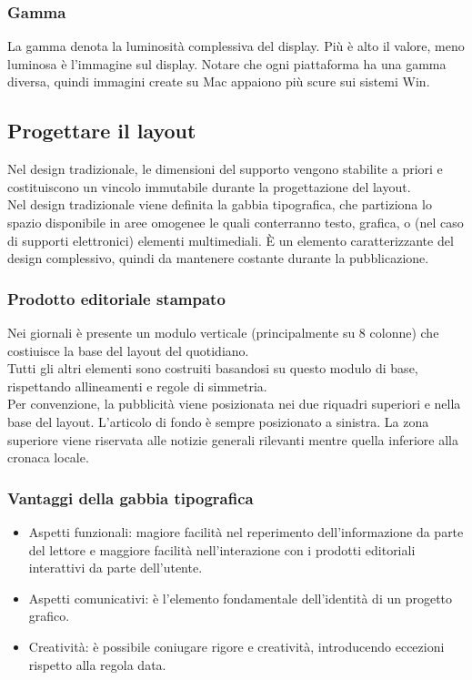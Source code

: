 \documentclass{article}
\begin{document}
\subsubsection{Gamma}
La gamma denota la luminosità complessiva del display. Più è alto il valore, meno luminosa è l'immagine sul display. Notare che ogni piattaforma ha una gamma diversa, quindi immagini create su Mac appaiono più scure sui sistemi Win.
\subsection{Progettare il layout}
Nel design tradizionale, le dimensioni del supporto vengono stabilite a priori e costituiscono un vincolo immutabile durante la progettazione del layout.\\
Nel design tradizionale viene definita la gabbia tipografica, che partiziona lo spazio disponibile in aree omogenee le quali conterranno testo, grafica, o (nel caso di supporti elettronici) elementi multimediali. È un elemento caratterizzante del design complessivo, quindi da mantenere costante durante la pubblicazione.
\subsubsection{Prodotto editoriale stampato}
Nei giornali è presente un modulo verticale (principalmente su 8 colonne) che costiuisce la base del layout del quotidiano.\\
Tutti gli altri elementi sono costruiti basandosi su questo modulo di base, rispettando allineamenti e regole di simmetria.\\
Per convenzione, la pubblicità viene posizionata nei due riquadri superiori e nella base del layout. L'articolo di fondo è sempre posizionato a sinistra. La zona superiore viene riservata alle notizie generali rilevanti mentre quella inferiore alla cronaca locale.
\subsubsection{Vantaggi della gabbia tipografica}
\begin{itemize}
\item Aspetti funzionali: magiore facilità nel reperimento dell'informazione da parte del lettore e maggiore facilità nell'interazione con i prodotti editoriali interattivi da parte dell'utente.
\item Aspetti comunicativi: è l'elemento fondamentale dell'identità di un progetto grafico.
\item Creatività: è possibile coniugare rigore e creatività, introducendo eccezioni rispetto alla regola data.
\end{itemize}
\end{document}
